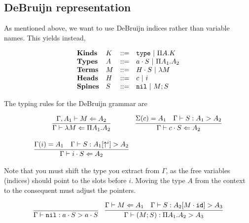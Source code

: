 \documentclass[11pt,twoside]{article}
\begin{document}
\subsection{DeBruijn representation}

As mentioned above, we want to use DeBruijn indices rather
than variable names.  This yields instead,

\renewcommand{\PiTyp}[2]{\Pi #1.#2}
\renewcommand{\Lam}[1]{\lambda #1}

$$
\begin{array}{llll}
\mathbf{Kinds} & K & ::= & \Type \Spb \PiTyp{A}{K} \\
\mathbf{Types} & A & ::= & a\cdot S \Spb \PiTyp{A_1}{A_2} \\
\mathbf{Terms} & M & ::= & H\cdot S \Spb \Lam{M} \\
\mathbf{Heads} & H & ::= & c \Spb i\\
\mathbf{Spines} & S & ::= & \Nil \Spb M;S\\
\end{array} 
$$


The typing rules for the DeBruijn grammar are

\newcommand{\CheckTy}[3][\Gamma]{#1\vdash #2 \Leftarrow #3}
\newcommand{\Focus}[4][\Gamma]{#1\vdash #2 : #3 > #4}

\bigskip 
\framebox{$\CheckTy{M}{A}$}
\bigskip 

$$
\begin{array}{cc}
\infer{\CheckTy{\Lam{M}}{\PiTyp{A_1}{A_2}}}{\CheckTy[\Gamma,A_1]{M}{A_2}} &
\infer{\CheckTy{c\cdot S}{A_2}}{\Sigma(c)=A_1 & \Focus{S}{A_1}{A_2}} \\\\
\infer{\CheckTy{i\cdot S}{A_2}}{\Gamma(i)=A_1 & \Focus{S}{A_1[\Shift^i]}{A_2}}
\end{array} 
$$

Note that you must shift the type you extract from $\Gamma$, as the
free variables (indices) should point to the slots before $i$.  Moving
the type $A$ from the context to the consequent must adjust the pointers.

\bigskip 
\framebox{$\Focus{S}{A_1}{A_2}$}
\bigskip 

$$
\begin{array}{lr}
\infer{\Focus{\Nil}{a\cdot S}{a\cdot S}}{} & 
\infer{\Focus{(M;S)}{\PiTyp{A_1}{A_2}}{A_3}}{\CheckTy{M}{A_1} & \Focus{S}{A_2[M\cdot\IdSub]}{A_3}}
\end{array} 
$$
\end{document}
